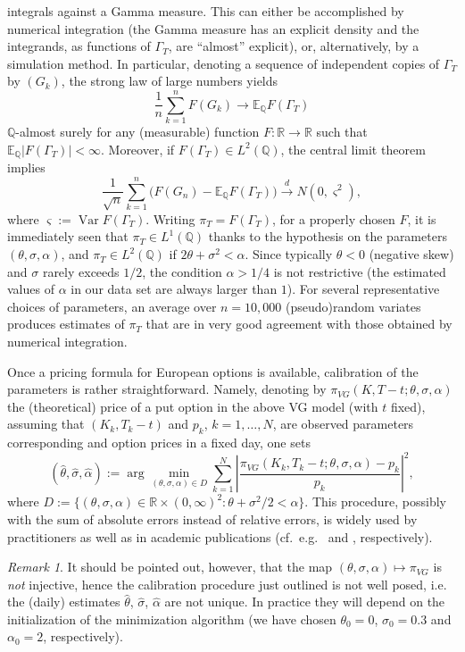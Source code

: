 \documentclass[11pt]{article}
\theoremstyle{remark}
\newtheorem{rmk}[prop]{Remark}
\newcommand{\E}{\mathbb{E}}
\newcommand{\Q}{\mathbb{Q}}
\newcommand{\erre}{\mathbb{R}}
\begin{document}
integrals against a Gamma measure. This can either be accomplished by
numerical integration (the Gamma measure has an explicit density and
the integrands, as functions of $\Gamma_T$, are ``almost'' explicit),
or, alternatively, by a simulation method. In particular, denoting a
sequence of independent copies of $\Gamma_T$ by $(G_k)$, the strong
law of large numbers yields
\[
\frac1n \sum_{k=1}^n F(G_k) \to \E_\Q F(\Gamma_T)
\]
$\Q$-almost surely for any (measurable) function $F:\erre \to \erre$
such that $\E_\Q\lvert F(\Gamma_T) \rvert < \infty$. Moreover, if
$F(\Gamma_T) \in L^2(\Q)$, the central limit theorem implies
\[
\frac{1}{\sqrt{n}} \sum_{k=1}^n \bigl( F(G_n) - \E_\Q F(\Gamma_T) \bigr)
\xrightarrow{d} N(0,\varsigma^2),
\]
where $\varsigma := \operatorname{Var} F(\Gamma_T)$. Writing
$\pi_T = F(\Gamma_T)$, for a properly chosen $F$, it is immediately
seen that $\pi_T \in L^1(\Q)$ thanks to the hypothesis on the
parameters $(\theta,\sigma,\alpha)$, and $\pi_T \in L^2(\Q)$ if
$2\theta+\sigma^2 < \alpha$. Since typically $\theta<0$ (negative
skew) and $\sigma$ rarely exceeds $1/2$, the condition $\alpha>1/4$ is
not restrictive (the estimated values of $\alpha$ in our data set are
always larger than $1$). For several representative choices of
parameters, an average over $n=10,000$ (pseudo)random variates produces
estimates of $\pi_T$ that are in very good agreement with those
obtained by numerical integration.

\medskip

Once a pricing formula for European options is available, calibration
of the parameters is rather straightforward. Namely, denoting by
$\pi_{VG}(K,T-t;\theta,\sigma,\alpha)$ the (theoretical) price of a
put option in the above VG model (with $t$ fixed), assuming that
$(K_k,T_k-t)$ and $p_k$, $k=1,\ldots,N$, are observed parameters
corresponding and option prices in a fixed day, one sets
\[
(\hat{\theta},\hat{\sigma},\hat{\alpha}) := 
\arg\min_{(\theta,\sigma,\alpha) \in D} \sum_{k=1}^N \left\vert 
\frac{\pi_{VG}(K_k,T_k-t;\theta,\sigma,\alpha)-p_k}{p_k} \right\vert^2,
\]
where
$D := \bigl\{ (\theta,\sigma,\alpha) \in \erre \times (0,\infty)^2 :
\theta + \sigma^2/2 < \alpha \bigr\}$.
This procedure, possibly with the sum of absolute errors instead of
relative errors, is widely used by practitioners as well as in
academic publications (cf.~e.g.~\cite{CarrWu:03} and \cite{CGMY},
respectively).

\begin{rmk}
  It should be pointed out, however, that the map
  $(\theta,\sigma,\alpha) \mapsto \pi_{VG}$ is \emph{not} injective,
  hence the calibration procedure just outlined is not well posed,
  i.e. the (daily) estimates $\hat{\theta}$, $\hat{\sigma}$,
  $\hat{\alpha}$ are not unique. In practice they will depend on the
  initialization of the minimization algorithm (we have chosen
  $\theta_0=0$, $\sigma_0=0.3$ and $\alpha_0 = 2$, respectively).
\end{rmk}
\end{document}
